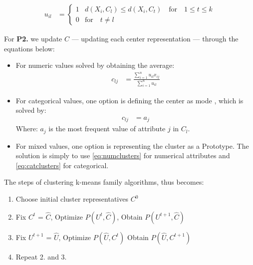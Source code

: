 \documentclass[../report.tex]{subfiles}
\begin{document}
\begin{align}
 \label{eq:uil}
  u_{il} &= 
  \begin{cases}
  1 & d(X_i,C_l) \leq d(X_i,C_t) \quad \text{for} \quad 1 \leq t \leq k \\
  0 & \text{for} \quad t \neq l
  \end{cases}
\end{align}

For \textbf{P2.} we update $C$ --- updating each center representation --- through the equations below:

\begin{itemize}
    \item For numeric values solved by obtaining the average:
      \begin{align}
        \label{eq:numclusters}
        c_{lj} &= \frac{ \sum_{i = 1}^{n}{ u_{ il }x_{ ij }  }}{\sum_{i = 1}^{n}{ u_{ il }}}
      \end{align}
    \item For categorical values, one option is defining the center as mode \cite{Ng1999}, which is solved by:
      \begin{align}
        \label{eq:catclusters}
      c_{lj} &= a_{j}
      \end{align}
      Where: $a_{j}$ is the most frequent value of attribute $j$ in $C_l$.
    \item For mixed values, one option is representing the cluster as a Prototype\cite{Huang97clusteringlarge,Huang1998}. The solution is simply to use \ref{eq:numclusters} for numerical attributes and \ref{eq:catclusters} for categorical.
\end{itemize}

The steps of clustering k-means family algorithms, thus becomes:

\begin{enumerate}
  \item Choose initial cluster representatives $C^0$
  \item Fix $C^t$ = $\hat{C}$, Optimize $P(U^{t}, \hat{ C })$, Obtain $P(U^{t + 1}, \hat{ C })$
  \item Fix $U^{t + 1}$ = $\hat{U}$, Optimize $P(\hat{U}, C^t)$ Obtain $P(\hat{ U }, C^{t + 1})$
  \item Repeat 2. and 3.
\end{enumerate}
\end{document}
